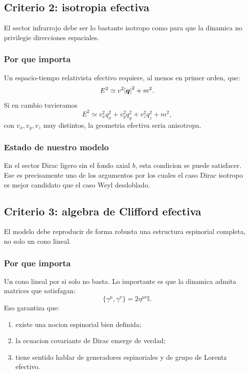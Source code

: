\subsection{Criterio 2: isotropia efectiva}
El sector infrarrojo debe ser lo bastante isotropo como para que la dinamica no privilegie direcciones espaciales.

\subsubsection*{Por que importa}
Un espacio-tiempo relativista efectivo requiere, al menos en primer orden, que:
\begin{equation}
E^2 \simeq v^2\abs{\bm{q}}^2 + m^2.
\label{c18:eq:isotropicdisp}
\end{equation}
Si en cambio tuvieramos
\begin{equation}
E^2 \simeq v_x^2 q_x^2 + v_y^2 q_y^2 + v_z^2 q_z^2 + m^2,
\end{equation}
con \(v_x,v_y,v_z\) muy distintos, la geometria efectiva seria anisotropa.

\subsubsection*{Estado de nuestro modelo}
En el sector Dirac ligero sin el fondo axial \(b\), esta condicion se puede satisfacer. Ese es precisamente uno de los argumentos por los cuales el caso Dirac isotropo es mejor candidato que el caso Weyl desdoblado.

\subsection{Criterio 3: algebra de Clifford efectiva}
El modelo debe reproducir de forma robusta una estructura espinorial completa, no solo un cono lineal.

\subsubsection*{Por que importa}
Un cono lineal por si solo no basta. Lo importante es que la dinamica admita matrices que satisfagan:
\begin{equation}
\{\gamma^\mu,\gamma^\nu\}=2\eta^{\mu\nu}\mathbb{I}.
\end{equation}
Eso garantiza que:
\begin{enumerate}[label=\arabic*.]
    \item existe una nocion espinorial bien definida;
    \item la ecuacion covariante de Dirac emerge de verdad;
    \item tiene sentido hablar de generadores espinoriales y de grupo de Lorentz efectivo.
\end{enumerate}

